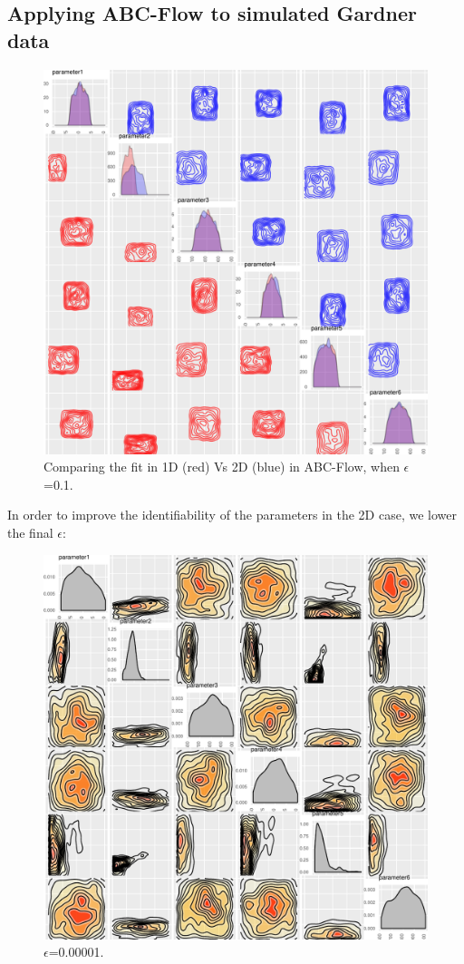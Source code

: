 \subsection{Applying ABC-Flow to simulated Gardner data}

\begin{figure}[htbp]
\centering
\includegraphics[scale=0.6]{chapterABCFlow/images/posterior_comparison_1D_2D.pdf}
\caption{Comparing the fit in 1D (red) Vs 2D (blue) in ABC-Flow, when $\epsilon$=0.1. }
\label{fig:1d-v-2d}
\end{figure}
\clearpage
In order to improve the identifiability of the parameters in the 2D case, we lower the final $\epsilon$:
\begin{figure}[htbp]
\centering
\includegraphics[scale=0.6]{chapterABCFlow/images/posterior_2d_4.pdf}
\caption[LoF caption]{$\epsilon$=0.00001.}
\label{fig:2d-e-0-00001}
\end{figure}
